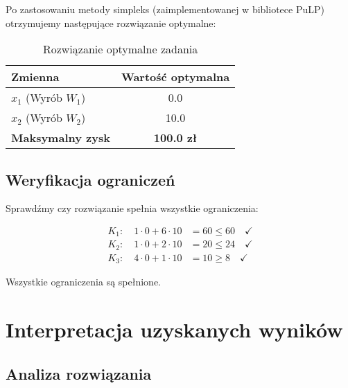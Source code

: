 \documentclass[12pt,a4paper]{article}
\begin{document}
Po zastosowaniu metody simpleks (zaimplementowanej w bibliotece PuLP) otrzymujemy następujące rozwiązanie optymalne:

\begin{table}[H]
\centering
\begin{tabular}{|l|c|}
\hline
\textbf{Zmienna} & \textbf{Wartość optymalna} \\ \hline
$x_1$ (Wyrób $W_1$) & 0.0 \\ \hline
$x_2$ (Wyrób $W_2$) & 10.0 \\ \hline
\textbf{Maksymalny zysk} & \textbf{100.0 zł} \\ \hline
\end{tabular}
\caption{Rozwiązanie optymalne zadania}
\end{table}

\subsection{Weryfikacja ograniczeń}

Sprawdźmy czy rozwiązanie spełnia wszystkie ograniczenia:

\begin{align*}
K_1: \quad 1 \cdot 0 + 6 \cdot 10 &= 60 \leq 60 \quad \checkmark \\
K_2: \quad 1 \cdot 0 + 2 \cdot 10 &= 20 \leq 24 \quad \checkmark \\
K_3: \quad 4 \cdot 0 + 1 \cdot 10 &= 10 \geq 8 \quad \checkmark
\end{align*}

Wszystkie ograniczenia są spełnione.

\section{Interpretacja uzyskanych wyników}

\subsection{Analiza rozwiązania}
\end{document}
